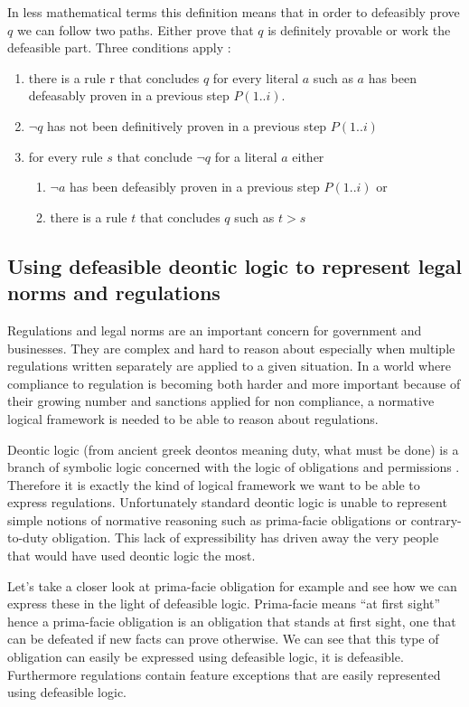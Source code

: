 \documentclass[10pt]{report}
\newcommand{\textgreek}[1]{\begingroup\fontencoding{LGR}\selectfont#1\endgroup} %
\begin{document}
In less mathematical terms this definition means that in order to defeasibly prove $q$ we can follow two paths. Either prove that $q$ is definitely provable or work the defeasible part. Three conditions apply :
\begin{enumerate}
\item there is a rule r that concludes $q$ for every literal $a$ such as $a$ has been defeasably proven in a previous step $P(1..i)$.
\item $\neg q$ has not been definitively proven in a previous step $P(1..i)$
\item for every rule $s$ that conclude $\neg q$ for a literal $a$ either
  \begin{enumerate}
  \item $\neg a$ has been defeasibly proven in a previous step $P(1..i)$ or
  \item there is a rule $t$ that concludes $q$ such as $t>s$
  \end{enumerate}
\end{enumerate}


\subsection{Using defeasible deontic logic to represent legal norms and regulations}

Regulations and legal norms are an important concern for government and businesses. They are complex and hard to reason about especially when multiple regulations written separately are applied to a given situation. In a world where compliance to regulation is becoming both harder and more important because of their growing number and sanctions applied for non compliance, a normative logical framework is needed to be able to reason about regulations.

Deontic logic (from ancient greek \textgreek{deontos} meaning duty, what must be done) is a branch of symbolic logic concerned with the logic of obligations and permissions \autocite{mcnamara_deontic_2010}. Therefore it is exactly the kind of logical framework we want to be able to express regulations. Unfortunately standard deontic logic is unable to represent simple notions of normative reasoning such as prima-facie obligations or contrary-to-duty obligation. This lack of expressibility has driven away the very people that would have used deontic logic the most\autocite{nute1997defeasible}.

Let's take a closer look at prima-facie obligation for example and see how we can express these in the light of defeasible logic. Prima-facie means \enquote{at first sight} hence a prima-facie obligation is an obligation that stands at first sight, one that can be defeated if new facts can prove otherwise. We can see that this type of obligation can easily be expressed using defeasible logic, it is defeasible. Furthermore regulations contain feature exceptions that are easily represented using defeasible logic.
\end{document}
